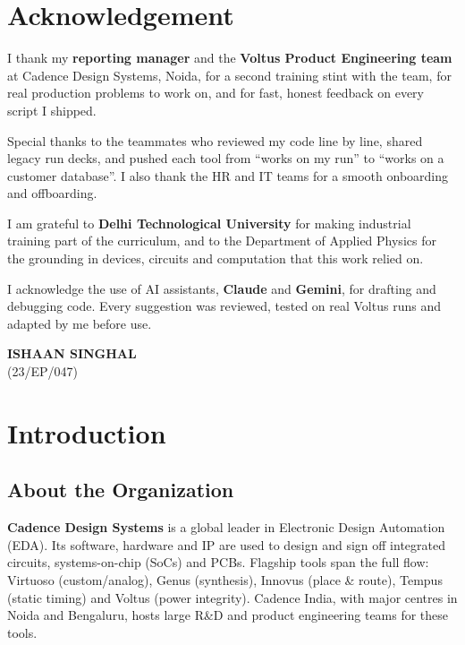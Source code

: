 \documentclass[11pt,a4paper]{article}
\begin{document}
\section{Acknowledgement}

I thank my \textbf{reporting manager} and the \textbf{Voltus Product Engineering team} at
Cadence Design Systems, Noida, for a second training stint with the team, for real
production problems to work on, and for fast, honest feedback on every script I shipped.

Special thanks to the teammates who reviewed my code line by line, shared legacy run
decks, and pushed each tool from ``works on my run'' to ``works on a customer database''.
I also thank the HR and IT teams for a smooth onboarding and offboarding.

I am grateful to \textbf{Delhi Technological University} for making industrial training
part of the curriculum, and to the Department of Applied Physics for the grounding in
devices, circuits and computation that this work relied on.

I acknowledge the use of AI assistants, \textbf{Claude} and \textbf{Gemini}, for drafting
and debugging code. Every suggestion was reviewed, tested on real Voltus runs and adapted by
me before use.

\vspace{1.5cm}
\begin{flushright}
\textbf{ISHAAN SINGHAL}\\
(23/EP/047)
\end{flushright}
\clearpage

\section{Introduction}

\subsection{About the Organization}
\textbf{Cadence Design Systems} is a global leader in Electronic Design Automation (EDA).
Its software, hardware and IP are used to design and sign off integrated circuits,
systems-on-chip (SoCs) and PCBs. Flagship tools span the full flow: Virtuoso (custom/analog),
Genus (synthesis), Innovus (place \& route), Tempus (static timing) and Voltus (power
integrity). Cadence India, with major centres in Noida and Bengaluru, hosts large R\&D and
product engineering teams for these tools.
\end{document}
